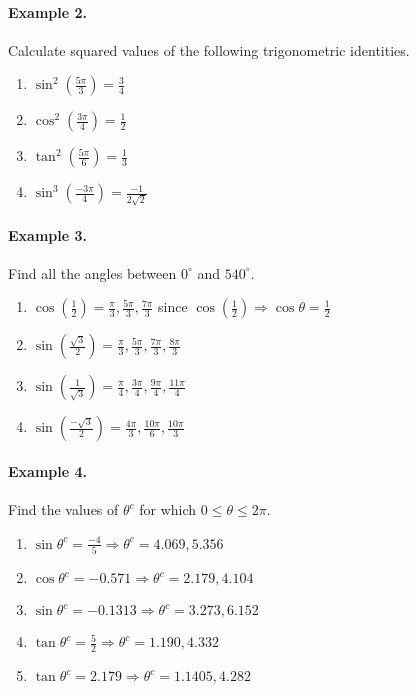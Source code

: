 \documentclass{article}
\begin{document}
\paragraph{Example 2.}
Calculate squared values of the following trigonometric identities.

\begin{enumerate}[label=\alph*)]
  \item $\sin^{2}\left( \frac{5\pi}{3} \right)=\frac{3}{4}$
  \item $\cos^{2}\left( \frac{3\pi}{4} \right)=\frac{1}{2}$
  \item $\tan^{2}\left( \frac{5\pi}{6} \right)=\frac{1}{3}$
  \item $\sin^{3}\left( \frac{-3\pi}{4} \right)=\frac{-1}{2\sqrt{2}}$
\end{enumerate}

\paragraph{Example 3.}
Find all the angles between $0^{\circ}$ and $540^{\circ}$.

\begin{enumerate}[label=\alph*)]
  \item $\cos\left(\frac{1}{2}\right) = \frac{\pi}{3}, \frac{5\pi}{3}, \frac{7\pi}{3}$ since $\cos\left(\frac{1}{2}\right) \Rightarrow \cos\theta=\frac{1}{2}$
  \item $\sin\left(\frac{\sqrt{3}}{2}\right) = \frac{\pi}{3}, \frac{5\pi}{3}, \frac{7\pi}{3}, \frac{8\pi}{3}$
  \item $\sin\left(\frac{1}{\sqrt{3}}\right) = \frac{\pi}{4}, \frac{3\pi}{4}, \frac{9\pi}{4}, \frac{11\pi}{4}$
  \item $\sin\left(\frac{-\sqrt{3}}{2}\right) = \frac{4\pi}{3}, \frac{10\pi}{6}, \frac{10\pi}{3}$
\end{enumerate}

\paragraph{Example 4.}
Find the values of $\theta^{c}$ for which $0\leq\theta\leq2\pi$.

\begin{enumerate}[label=\alph*)]
  \item $\sin\theta^{c}=\frac{-4}{5} \Rightarrow \theta^{c}=4.069, 5.356$
  \item $\cos\theta^{c}=-0.571 \Rightarrow \theta^{c}=2.179, 4.104$
  \item $\sin\theta^{c}=-0.1313 \Rightarrow \theta^{c}=3.273, 6.152$
  \item $\tan\theta^{c}=\frac{5}{2} \Rightarrow \theta^{c}=1.190, 4.332$
  \item $\tan\theta^{c}=2.179 \Rightarrow \theta^{c}=1.1405, 4.282$
\end{enumerate}
\end{document}
